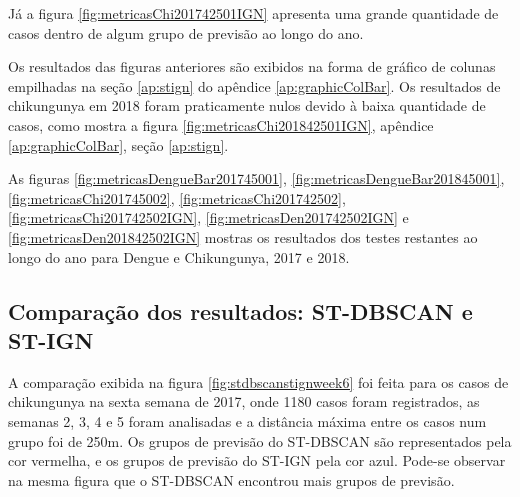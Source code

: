 Já a figura \ref{fig:metricasChi201742501IGN} apresenta uma grande quantidade de casos dentro de algum grupo de previsão ao longo do ano.
\begin{figure}[!ht]
	\centering	
\end{figure}
\FloatBarrier

Os resultados das figuras anteriores são exibidos na forma de gráfico de colunas empilhadas na seção \ref{ap:stign} do apêndice \ref{ap:graphicColBar}. 
Os resultados de chikungunya em 2018 foram praticamente nulos devido à baixa quantidade de casos, como mostra a figura \ref{fig:metricasChi201842501IGN}, apêndice \ref{ap:graphicColBar}, seção \ref{ap:stign}.

As figuras \ref{fig:metricasDengueBar201745001}, \ref{fig:metricasDengueBar201845001}, \ref{fig:metricasChi201745002}, \ref{fig:metricasChi201742502}, \ref{fig:metricasChi201742502IGN}, \ref{fig:metricasDen201742502IGN} e \ref{fig:metricasDen201842502IGN} mostras os resultados dos testes restantes ao longo do ano para Dengue e Chikungunya, 2017 e 2018.

\subsection{Comparação dos resultados: ST-DBSCAN e ST-IGN}

A comparação exibida na figura \ref{fig:stdbscanstignweek6} foi feita para os casos de chikungunya na sexta semana de 2017, onde 1180 casos foram registrados, as semanas 2, 3, 4 e 5 foram analisadas e a distância máxima entre os casos num grupo foi de 250m. Os grupos de previsão do \acrshort{ST-DBSCAN} são representados pela cor vermelha, e os grupos de previsão do ST-IGN pela cor azul.
Pode-se observar na mesma figura que o \acrshort{ST-DBSCAN} encontrou mais grupos de previsão.

